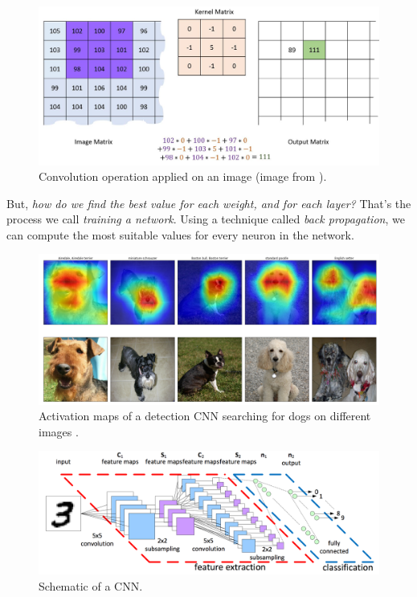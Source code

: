 \begin{figure}[h]
	\centering
	\includegraphics[width=5in]{images/convolution}
	\caption{Convolution operation applied on an image (image from \cite{image-convolution}).}
	\label{fig:1_convolution}
\end{figure}





But, \emph{how do we find the best value for each weight, and for each layer?} That's the process we call \textit{training a network}. Using a technique called \emph{back propagation}, we can compute the most suitable values for every neuron in the network.\\

\begin{figure}[h]
	\centering
	\includegraphics[width=0.9\linewidth]{images/activation_maps}
	\caption{Activation maps of a detection CNN searching for dogs on different images \cite{activation-maps}.}
	\label{fig:1_activation_maps}
\end{figure}



\begin{figure}[h]
	\centering
	\includegraphics[width=0.9\linewidth]{images/cnn}
	\caption{Schematic of a CNN.}
	\label{fig:1_cnn}
\end{figure}

